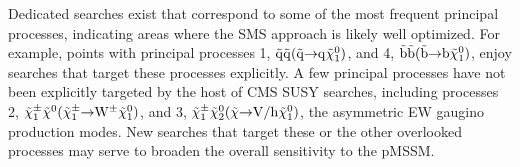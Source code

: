\FloatBarrier

Dedicated searches exist that correspond to some of the most frequent principal processes, indicating areas where the SMS approach is likely well optimized. For example, points with principal processes 1, $\tilde{\rm q}\tilde{\rm q}(\tilde{\rm q} \hspace{-1mm}\rightarrow \hspace{-1mm}{\rm q}\tilde{\chi}_{1}^{0})$, and 4, $\tilde{\rm b}\tilde{\rm b}(\tilde{\rm b} \hspace{-1mm}\rightarrow \hspace{-1mm}{\rm b}\tilde{\chi}_{1}^{0})$, enjoy searches that target these processes explicitly.   A few principal processes have not been explicitly targeted by the host of CMS SUSY searches, including processes 2, $\tilde{\chi}^{\pm}_{1}\tilde{\chi}^{0}(\tilde{\chi}^{\pm}_{1} \hspace{-1mm}\rightarrow \hspace{-1mm}{\rm W}^{\pm}\tilde{\chi}_{1}^{0})$, and 3, $\tilde{\chi}^{\pm}_{1}\tilde{\chi}^{0}_{2}(\tilde{\chi} \hspace{-1mm}\rightarrow \hspace{-1mm}{\rm V/h}\tilde{\chi}_{1}^{0})$, the asymmetric EW gaugino production modes. New searches that target these or the other overlooked processes may serve to broaden the overall sensitivity to the pMSSM.


